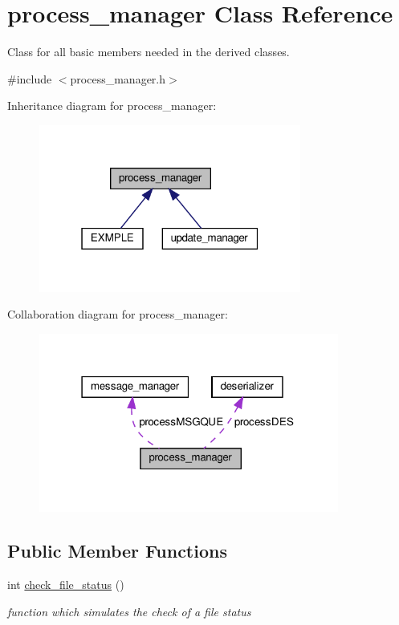 \hypertarget{classprocess__manager}{}\section{process\+\_\+manager Class Reference}
\label{classprocess__manager}


Class for all basic members needed in the derived classes.  




{\ttfamily \#include $<$process\+\_\+manager.\+h$>$}



Inheritance diagram for process\+\_\+manager\+:
\nopagebreak
\begin{figure}[H]
\begin{center}
\leavevmode
\includegraphics[width=244pt]{classprocess__manager__inherit__graph}
\end{center}
\end{figure}


Collaboration diagram for process\+\_\+manager\+:
\nopagebreak
\begin{figure}[H]
\begin{center}
\leavevmode
\includegraphics[width=279pt]{classprocess__manager__coll__graph}
\end{center}
\end{figure}
\subsection*{Public Member Functions}
\begin{DoxyCompactItemize}
\item 
int \hyperlink{classprocess__manager_a8abc5c342a3ed882973183b77405b667}{check\+\_\+file\+\_\+status} ()
\begin{DoxyCompactList}\small\item\em function which simulates the check of a file status \end{DoxyCompactList}\end{DoxyCompactItemize}
